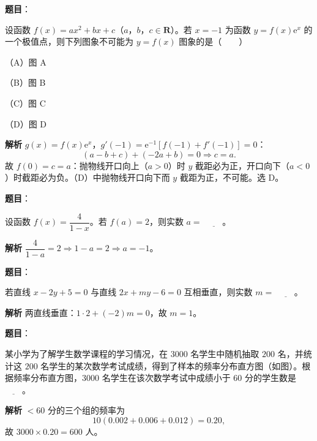 \begin{answer}

\textbf{题目}：

设函数 $f(x)=ax^2+bx+c$（$a$，$b$，$c\in\mathbf R$）。若 $x=-1$ 为函数 $y=f(x)\mathrm e^x$ 的一个极值点，则下列图象不可能为 $y=f(x)$ 图象的是\mbox{（　　）}

（A）图 A

（B）图 B

（C）图 C

（D）图 D
\nopagebreak[4]
\begin{center}\end{center}
\nopagebreak[4]
\textbf{解析}
$g(x)=f(x)\mathrm e^x$，$g'(-1)=\mathrm e^{-1}[f(-1)+f'(-1)]=0$：
\nopagebreak[4]
\[(a-b+c)+(-2a+b)=0\Longrightarrow c=a.\]
故 $f(0)=c=a$：抛物线开口向上（$a>0$）时 $y$ 截距必为正，开口向下（$a<0$）时截距必为负。（D）中抛物线开口向下而 $y$ 截距为正，不可能。选 D。


\end{answer}
\begin{answer}

\textbf{题目}：

设函数 $f(x)=\dfrac4{1-x}$。若 $f(a)=2$，则实数 $a=$ $\underline{\qquad}$。

\textbf{解析}
$\dfrac4{1-a}=2\Longrightarrow1-a=2\Longrightarrow a=-1$。


\end{answer}
\begin{answer}

\textbf{题目}：

若直线 $x-2y+5=0$ 与直线 $2x+my-6=0$ 互相垂直，则实数 $m=$ $\underline{\qquad}$。

\textbf{解析}
两直线垂直：$1\cdot2+(-2)m=0$，故 $m=1$。


\end{answer}
\begin{answer}

\textbf{题目}：

某小学为了解学生数学课程的学习情况，在 $3000$ 名学生中随机抽取 $200$ 名，并统计这 $200$ 名学生的某次数学考试成绩，得到了样本的频率分布直方图（如图）。根据频率分布直方图，$3000$ 名学生在该次数学考试中成绩小于 $60$ 分的学生数是 $\underline{\qquad}$。
\nopagebreak[4]
\begin{center}\end{center}
\nopagebreak[4]
\textbf{解析}
$<60$ 分的三个组的频率为
\nopagebreak[4]
\[10(0.002+0.006+0.012)=0.20,\]
故 $3000\times0.20=600$ 人。


\end{answer}
